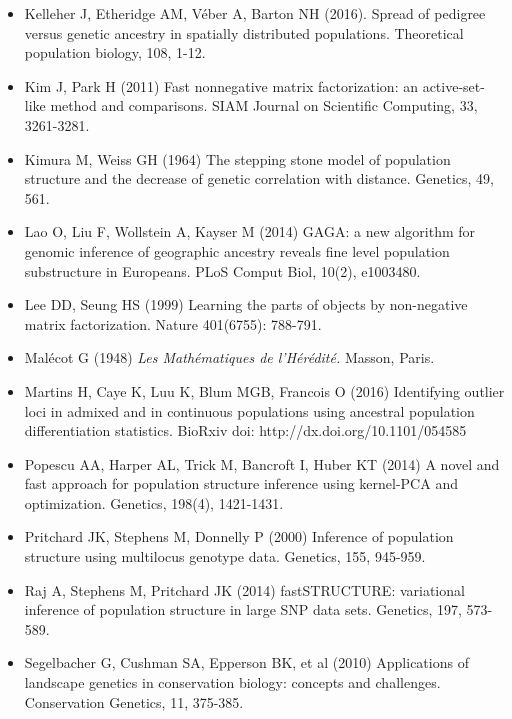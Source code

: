 \begin{itemize}
\item[] Kelleher J, Etheridge AM, V\'eber A, Barton NH (2016). Spread of pedigree versus genetic ancestry in spatially distributed populations. Theoretical population biology, 108, 1-12.

\item[] Kim J, Park H (2011) Fast nonnegative matrix factorization: an active-set-like method and comparisons. SIAM Journal on Scientific Computing, 33, 3261-3281.

\item[] Kimura M, Weiss GH (1964) The stepping stone model of population structure and the decrease of genetic correlation with distance. Genetics, 49, 561.

\item[] Lao O, Liu F, Wollstein A,  Kayser M (2014) GAGA: a new algorithm for genomic inference of geographic ancestry reveals fine level population substructure in Europeans. PLoS Comput Biol, 10(2), e1003480.

\item[] Lee DD, Seung HS (1999) Learning the parts of objects by non-negative matrix factorization. Nature 401(6755): 788-791.


\item[] Mal\'ecot G (1948) {\it Les Math\'ematiques de l'H\'er\'edit\'e.} Masson, Paris.

\item[] Martins H, Caye K, Luu K,  Blum MGB, Francois O (2016) Identifying outlier loci in admixed and in continuous populations using ancestral population differentiation statistics. BioRxiv doi: http://dx.doi.org/10.1101/054585 

\item[] Popescu AA, Harper AL, Trick M, Bancroft I,  Huber KT (2014) A novel and fast approach for population structure inference using kernel-PCA and optimization. Genetics, 198(4), 1421-1431.

\item[] Pritchard JK, Stephens M, Donnelly P (2000) Inference of population structure using multilocus genotype data. Genetics, 155, 945-959.

\item[] Raj A, Stephens M, Pritchard JK (2014) fastSTRUCTURE: variational inference of population structure in large SNP data sets. Genetics, 197, 573-589.

\item[] Segelbacher G, Cushman SA, Epperson BK, et al (2010) Applications of landscape genetics in conservation biology: concepts and challenges. Conservation Genetics, 11, 375-385.


\end{itemize}
